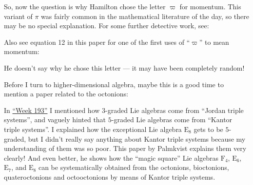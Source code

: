 \documentclass{article}
\def\tightlist{}
\renewcommand{\texttt}[1]{%
  \begingroup
  \ttfamily
  \begingroup\lccode`~=`/\lowercase{\endgroup\def~}{/\discretionary{}{}{}}%
  \begingroup\lccode`~=`[\lowercase{\endgroup\def~}{[\discretionary{}{}{}}%
  \begingroup\lccode`~=`.\lowercase{\endgroup\def~}{.\discretionary{}{}{}}%
  \catcode`/=\active\catcode`[=\active\catcode`.=\active
  \scantokens{#1\noexpand}%
  \endgroup
}
\begin{document}
So, now the question is why Hamilton chose the letter \(\varpi\) for
momentum. This variant of \(\pi\) was fairly common in the mathematical
literature of the day, so there may be no special explanation. For some
further detective work, see:


Also see equation 12 in this paper for one of the first uses of
``\(\varpi\)'' to mean momentum:


He doesn't say why he chose this letter --- it may have been completely
random!

Before I turn to higher-dimensional algebra, maybe this is a good time
to mention a paper related to the octonions:


In \protect\hyperlink{week193}{``Week 193''} I mentioned how
\(3\)-graded Lie algebras come from ``Jordan triple systems'', and
vaguely hinted that \(5\)-graded Lie algebras come from ``Kantor triple
systems''. I explained how the exceptional Lie algebra \(\mathrm{E}_8\)
gets to be \(5\)-graded, but I didn't really say anything about Kantor
triple systems because my understanding of them was so poor. This paper
by Palmkvist explains them very clearly! And even better, he shows how
the ``magic square'' Lie algebras \(\mathrm{F}_4\), \(\mathrm{E}_6\),
\(\mathrm{E}_7\), and \(\mathrm{E}_8\) can be systematically obtained
from the octonions, bioctonions, quateroctonions and octooctonions by
means of Kantor triple systems.
\end{document}
